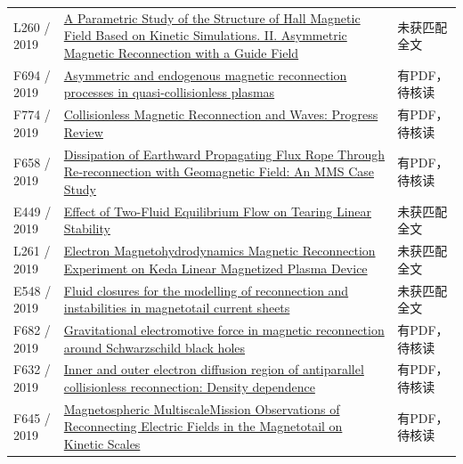 \begin{longtable}{P{24mm}P{97mm}P{27mm}}
L260 / 2019 & \href{https://doi.org/10.3847/1538-4357/ab35d9}{A Parametric Study of the Structure of Hall Magnetic Field Based on Kinetic Simulations. II. Asymmetric Magnetic Reconnection with a Guide Field} & 未获匹配全文\\

F694 / 2019 & \href{https://doi.org/10.1063/1.5086170}{Asymmetric and endogenous magnetic reconnection processes in quasi-collisionless plasmas} & 有PDF，待核读\\

F774 / 2019 & \href{https://doi.org/10.3389/fspas.2019.00070}{Collisionless Magnetic Reconnection and Waves: Progress Review} & 有PDF，待核读\\

F658 / 2019 & \href{https://doi.org/10.1029/2018ja026451}{Dissipation of Earthward Propagating Flux Rope Through Re‐reconnection with Geomagnetic Field: An MMS Case Study} & 有PDF，待核读\\

E449 / 2019 & \href{http://ui.adsabs.harvard.edu/abs/2019APS..DPPP10083G/abstract}{Effect of Two-Fluid Equilibrium Flow on Tearing Linear Stability} & 未获匹配全文\\

L261 / 2019 & \href{https://doi.org/10.1088/0256-307x/36/1/015201}{Electron Magnetohydrodynamics Magnetic Reconnection Experiment on Keda Linear Magnetized Plasma Device} & 未获匹配全文\\

E548 / 2019 & \href{https://dataspace.princeton.edu/handle/88435/dsp015d86p299f}{Fluid closures for the modelling of reconnection and instabilities in magnetotail current sheets} & 未获匹配全文\\

F682 / 2019 & \href{https://doi.org/10.1103/physrevd.99.063017}{Gravitational electromotive force in magnetic reconnection around Schwarzschild black holes} & 有PDF，待核读\\

F632 / 2019 & \href{https://doi.org/10.1063/1.5109368}{Inner and outer electron diffusion region of antiparallel collisionless reconnection: Density dependence} & 有PDF，待核读\\

F645 / 2019 & \href{https://doi.org/10.1029/2019gl083782}{Magnetospheric MultiscaleMission Observations of Reconnecting Electric Fields in the Magnetotail on Kinetic Scales} & 有PDF，待核读\\


\end{longtable}
